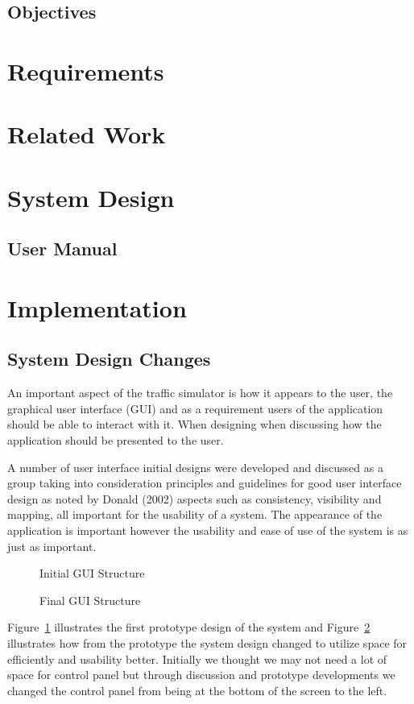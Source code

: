 \documentclass[11pt]{article}
\begin{document}
	\subsection{Objectives} %
	\section{Requirements} %
	\section{Related Work} %
	\section{System Design}
	\subsection{User Manual}
	\section{Implementation} %
	\subsection{System Design Changes}
	An important aspect of the traffic simulator is how it appears to the user, the graphical user interface (GUI) and as a requirement users of the application should be able to interact with it. When designing when discussing how the application should be presented to the user.
	
	A number of user interface initial designs were developed and discussed as a group taking into consideration principles and guidelines for good user interface design as noted by Donald \cite{Norman} (2002) aspects such as consistency, visibility and mapping, all important for the usability of a system. The appearance of the application is important however the usability and ease of use of the system is as just as important.
	\begin{figure}[h]
	\caption{Initial GUI Structure}
	\label{initialGUI}
	\end{figure}
	
	\begin{figure}[h]
	\caption{Final GUI Structure}
	\label{finalGUI}
	\end{figure}
	Figure~\ref{initialGUI} illustrates the first prototype design of the system and Figure~\ref{finalGUI} illustrates how from the prototype the system design changed to utilize space for efficiently and usability better. 
	Initially we thought we may not need a lot of space for control panel but through discussion and prototype developments we changed the control panel from being at the bottom of the screen to the left. 
	
\end{document}
